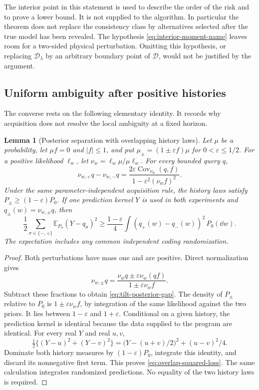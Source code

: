 \documentclass[11pt]{amsart}
\newtheorem{lemma}[theorem]{Lemma}
\theoremstyle{definition}\newtheorem{definition}[theorem]{Definition}
\theoremstyle{remark}\newtheorem{remark}[theorem]{Remark}
\newcommand{\E}{\mathbb E}\newcommand{\Prob}{\mathbb P}
\begin{document}
The interior point in this statement is used to describe the order of the
risk and to prove a lower bound. It is not supplied to the algorithm.
In particular the theorem does not replace the consistency class by
alternatives selected after the true model has been revealed. The
hypothesis \eqref{eq:interior-moment-name} leaves room for a two-sided
physical perturbation. Omitting this hypothesis, or replacing
$\mathcal D_\lambda$ by an arbitrary boundary point of $\mathcal D$,
would not be justified by the argument.

\subsection{Uniform ambiguity after positive histories}
The converse rests on the following elementary identity. It records why
acquisition does not resolve the local ambiguity at a fixed horizon.

\begin{lemma}[Posterior separation with overlapping history laws]
\label{lem:overlap-tilt}
Let $\mu$ be a probability, let $\mu f=0$ and $|f|\le1$, and put
$\mu_\pm=(1\pm\varepsilon f)\mu$ for $0<\varepsilon\le1/2$.
For a positive likelihood $\ell_w$, let
$\nu_w=\ell_w\mu/\mu\ell_w$. For every bounded query $q$,
\begin{equation}\label{eq:tilt-posterior-gap}
 \nu_{w,+}q-\nu_{w,-}q
 =\frac{2\varepsilon\operatorname{Cov}_{\nu_w}(q,f)}
        {1-\varepsilon^2(\nu_w f)^2}.
\end{equation}
Under the same parameter-independent acquisition rule, the history laws
satisfy $P_\pm\ge(1-\varepsilon)P_0$. If one prediction kernel $Y$
is used in both experiments and $q_\pm(w)=\nu_{w,\pm}q$, then
\begin{equation}\label{eq:overlap-squared-loss}
 \frac12\sum_{\sigma\in\{-,+\}}\E_{P_\sigma}(Y-q_\sigma)^2
 \ge\frac{1-\varepsilon}{4}
       \int(q_+(w)-q_-(w))^2\,P_0(\dd w).
\end{equation}
The expectation includes any common independent coding randomization.
\end{lemma}
\begin{proof}
Both perturbations have mass one and are positive. Direct normalization
gives
\[
 \nu_{w,\pm}q=
 \frac{\nu_w q\pm\varepsilon\nu_w(qf)}{1\pm\varepsilon\nu_w f}.
\]
Subtract these fractions to obtain \eqref{eq:tilt-posterior-gap}.
The density of $P_\pm$ relative to $P_0$ is
$1\pm\varepsilon\nu_w f$, by integration of the same likelihood
against the two priors. It lies between $1-\varepsilon$ and
$1+\varepsilon$. Conditional on a given history, the prediction kernel
is identical because the data supplied to the program are identical.
For every real $Y$ and real $u,v$,
\[
 \tfrac12\{(Y-u)^2+(Y-v)^2\}
 =\bigl(Y-(u+v)/2\bigr)^2+(u-v)^2/4.
\]
Dominate both history measures by $(1-\varepsilon)P_0$, integrate
this identity, and discard its nonnegative first term. This proves
\eqref{eq:overlap-squared-loss}. The same calculation integrates
randomized predictions. No equality of the two history laws is required.
\end{proof}
\end{document}
